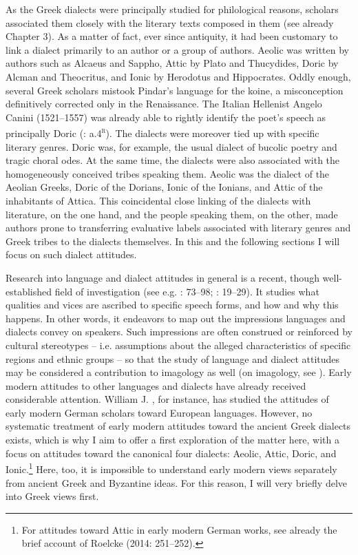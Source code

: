As the Greek dialects were principally studied for philological reasons, scholars associated them closely with the literary texts composed in them (see already Chapter 3). As a matter of fact, ever since antiquity, it had been customary to link a dialect primarily to an author or a group of authors. Aeolic was written by authors such as Alcaeus and Sappho, Attic by Plato and Thucydides, Doric by Alcman and Theocritus, and Ionic by Herodotus and Hippocrates. Oddly enough, several Greek scholars mistook Pindar’s language for the koine, a misconception definitively corrected only in the Renaissance. The Italian Hellenist Angelo Canini (1521–1557) was already able to rightly identify the poet’s speech as principally Doric (\citealt{Canini1555}: a.4\textsc{\textsuperscript{r}}). The dialects were moreover tied up with specific literary genres. Doric was, for example, the usual dialect of bucolic poetry and tragic choral odes. At the same time, the dialects were also associated with the homogeneously conceived tribes speaking them. Aeolic was the dialect of the Aeolian Greeks, Doric of the Dorians, Ionic of the Ionians, and Attic of the inhabitants of Attica. This coincidental close linking of the dialects with literature, on the one hand, and the people speaking them, on the other, made authors prone to transferring evaluative labels associated with literary genres and Greek tribes to the dialects themselves. In this and the following sections I will focus on such dialect attitudes.

Research into language and dialect attitudes in general is a recent, though well-established field of investigation (see e.g. \citealt{Edwards2009}: 73–98; \citealt{Garrett2010}: 19–29). It studies what qualities and vices are ascribed to specific speech forms, and how and why this happens. In other words, it endeavors to map out the impressions languages and dialects convey on speakers. Such impressions are often construed or reinforced by cultural stereotypes – i.e. assumptions about the alleged characteristics of specific regions and ethnic groups – so that the study of language and dialect attitudes may be considered a contribution to imagology as well (on imagology, see \citealt{BellerLeerssen2007}). Early modern attitudes to other languages and dialects have already received considerable attention. William J. \citet{Jones1999}, for instance, has studied the attitudes of early modern German scholars toward European languages. However, no systematic treatment of early modern attitudes toward the ancient Greek dialects exists, which is why I aim to offer a first exploration of the matter here, with a focus on attitudes toward the canonical four dialects: Aeolic, Attic, Doric, and Ionic.\footnote{For attitudes toward Attic in early modern German works, see already the brief account of Roelcke (2014: 251–252).} Here, too, it is impossible to understand early modern views separately from ancient Greek and Byzantine ideas. For this reason, I will very briefly delve into Greek views first.

